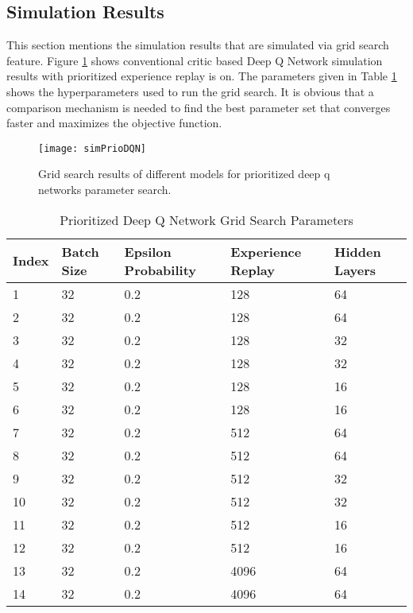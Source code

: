 \documentclass{ituphdreport}
\begin{document}
\subsection{Simulation Results} \label{sec:simulationresults}
This section mentions the simulation results that are simulated via grid search feature. Figure \ref{fig:simPrioDQN} shows conventional critic based Deep Q Network simulation results with prioritized experience replay is on. The parameters given in Table \ref{fig:simPrioDQN} shows the hyperparameters used to run the grid search. It is obvious that a comparison mechanism is needed to find the best parameter set that converges faster and maximizes the objective function. 

\begin{figure}[H]
	\begin{center}
		\texttt{[image: simPrioDQN]}
	\end{center}
	\caption{Grid search results of different models for prioritized deep q networks parameter search.
		\label{fig:simPrioDQN}}
\end{figure}

\begin{table}[]
	\begin{center}
	\begin{tabular}{lllll}
Index &	Batch Size	& Epsilon Probability	& Experience Replay	& Hidden Layers \\
\hline
1	&32	&0.2	&128	&64 \\
2	&32	&0.2	&128	&64 \\
3	&32	&0.2	&128	&32\\
4	&32	&0.2	&128	&32\\
5	&32	&0.2	&128	&16\\
6	&32	&0.2	&128	&16\\
7	&32	&0.2	&512	&64\\
8	&32	&0.2	&512	&64\\
9	&32	&0.2	&512	&32\\
10	&32	&0.2	&512	&32\\
11	&32	&0.2	&512	&16\\
12	&32	&0.2	&512	&16\\
13	&32	&0.2	&4096	&64\\
14	&32	&0.2	&4096	&64
	\end{tabular}
	\caption{Prioritized Deep Q Network Grid Search Parameters
	\label{table:priodqnsim}}
\end{center}
\end{table}
\end{document}

